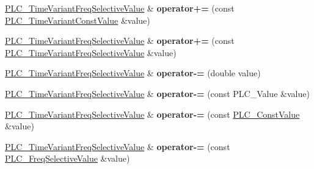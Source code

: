\begin{DoxyCompactItemize}
\item 
\hypertarget{classns3_1_1PLC__TimeVariantFreqSelectiveValue_a5127dca479c4976f95eff03281689994}{\hyperlink{classns3_1_1PLC__TimeVariantFreqSelectiveValue}{\-P\-L\-C\-\_\-\-Time\-Variant\-Freq\-Selective\-Value} \& {\bfseries operator+=} (const \hyperlink{classns3_1_1PLC__TimeVariantConstValue}{\-P\-L\-C\-\_\-\-Time\-Variant\-Const\-Value} \&value)}\label{classns3_1_1PLC__TimeVariantFreqSelectiveValue_a5127dca479c4976f95eff03281689994}

\item 
\hypertarget{classns3_1_1PLC__TimeVariantFreqSelectiveValue_a569140ce800b7b5050d12c0d0f8f4362}{\hyperlink{classns3_1_1PLC__TimeVariantFreqSelectiveValue}{\-P\-L\-C\-\_\-\-Time\-Variant\-Freq\-Selective\-Value} \& {\bfseries operator+=} (const \hyperlink{classns3_1_1PLC__TimeVariantFreqSelectiveValue}{\-P\-L\-C\-\_\-\-Time\-Variant\-Freq\-Selective\-Value} \&value)}\label{classns3_1_1PLC__TimeVariantFreqSelectiveValue_a569140ce800b7b5050d12c0d0f8f4362}

\item 
\hypertarget{classns3_1_1PLC__TimeVariantFreqSelectiveValue_a99f9d2faf5dcb29d6000f2b08a4d6ff9}{\hyperlink{classns3_1_1PLC__TimeVariantFreqSelectiveValue}{\-P\-L\-C\-\_\-\-Time\-Variant\-Freq\-Selective\-Value} \& {\bfseries operator-\/=} (double value)}\label{classns3_1_1PLC__TimeVariantFreqSelectiveValue_a99f9d2faf5dcb29d6000f2b08a4d6ff9}

\item 
\hypertarget{classns3_1_1PLC__TimeVariantFreqSelectiveValue_a374ed9d63a7268ee5d9ded2134b2d706}{\hyperlink{classns3_1_1PLC__TimeVariantFreqSelectiveValue}{\-P\-L\-C\-\_\-\-Time\-Variant\-Freq\-Selective\-Value} \& {\bfseries operator-\/=} (const \-P\-L\-C\-\_\-\-Value \&value)}\label{classns3_1_1PLC__TimeVariantFreqSelectiveValue_a374ed9d63a7268ee5d9ded2134b2d706}

\item 
\hypertarget{classns3_1_1PLC__TimeVariantFreqSelectiveValue_a71de767542d1de876a78296121fc805b}{\hyperlink{classns3_1_1PLC__TimeVariantFreqSelectiveValue}{\-P\-L\-C\-\_\-\-Time\-Variant\-Freq\-Selective\-Value} \& {\bfseries operator-\/=} (const \hyperlink{classns3_1_1PLC__ConstValue}{\-P\-L\-C\-\_\-\-Const\-Value} \&value)}\label{classns3_1_1PLC__TimeVariantFreqSelectiveValue_a71de767542d1de876a78296121fc805b}

\item 
\hypertarget{classns3_1_1PLC__TimeVariantFreqSelectiveValue_add044f635c1295e1a977ec04df6aa3b3}{\hyperlink{classns3_1_1PLC__TimeVariantFreqSelectiveValue}{\-P\-L\-C\-\_\-\-Time\-Variant\-Freq\-Selective\-Value} \& {\bfseries operator-\/=} (const \hyperlink{classns3_1_1PLC__FreqSelectiveValue}{\-P\-L\-C\-\_\-\-Freq\-Selective\-Value} \&value)}\label{classns3_1_1PLC__TimeVariantFreqSelectiveValue_add044f635c1295e1a977ec04df6aa3b3}


\end{DoxyCompactItemize}
